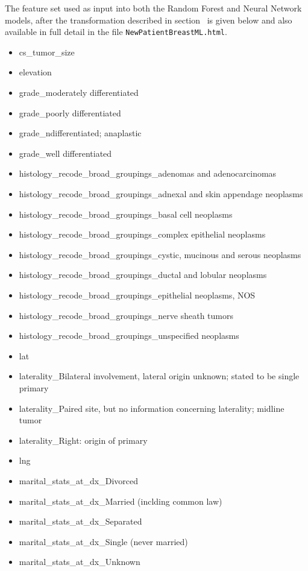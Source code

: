 \documentclass[10pt,letterpaper]{article}
\newcommand{\codewhite}[1]{\colorbox{white}{\texttt{#1}}}
\begin{document}
The feature set used as input into both the Random Forest and Neural Network models, after the transformation described in section~ is given below and also available in full detail in the file 
\codewhite{NewPatientBreastML.html}.

\begin{itemize}[noitemsep]
\item cs\_tumor\_size
\item elevation
\item grade\_moderately differentiated
\item grade\_poorly differentiated
\item grade\_ndifferentiated; anaplastic
\item grade\_well differentiated
\item histology\_recode\_broad\_groupings\_adenomas and adenocarcinomas
\item histology\_recode\_broad\_groupings\_adnexal and skin appendage neoplasms
\item histology\_recode\_broad\_groupings\_basal cell neoplasms
\item histology\_recode\_broad\_groupings\_complex epithelial neoplasms
\item histology\_recode\_broad\_groupings\_cystic, mucinous and serous neoplasms
\item histology\_recode\_broad\_groupings\_ductal and lobular neoplasms
\item histology\_recode\_broad\_groupings\_epithelial neoplasms, NOS
\item histology\_recode\_broad\_groupings\_nerve sheath tumors
\item histology\_recode\_broad\_groupings\_unspecified neoplasms
\item lat
\item laterality\_Bilateral involvement, lateral origin unknown; stated to be single primary
\item laterality\_Paired site, but no information concerning laterality; midline tumor
\item laterality\_Right: origin of primary
\item lng
\item marital\_stats\_at\_dx\_Divorced
\item marital\_stats\_at\_dx\_Married (inclding common law)
\item marital\_stats\_at\_dx\_Separated
\item marital\_stats\_at\_dx\_Single (never married)
\item marital\_stats\_at\_dx\_Unknown

\end{itemize}
\end{document}

